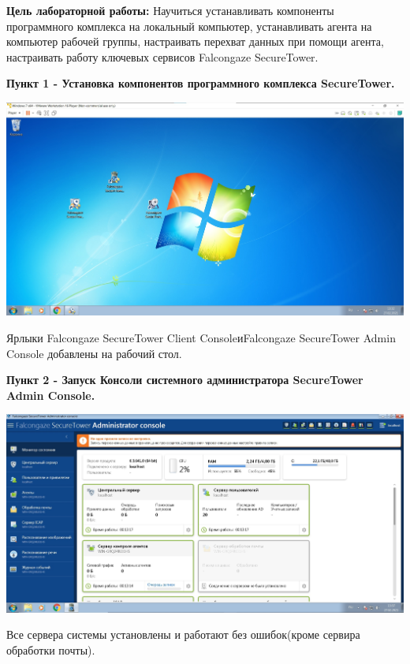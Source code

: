 \documentclass[a4paper,14pt]{extarticle}
\begin{document}
    \textbf{Цель лабораторной работы:}
    Научиться устанавливать компоненты программного комплекса на локальный компьютер, 
    устанавливать агента на компьютер рабочей группы, настраивать перехват данных при 
    помощи агента, настраивать работу ключевых сервисов Falcongaze SecureTower.

    \textbf{Пункт 1 - Установка компонентов программного комплекса SecureTower.} 
    \begin{center}
        \includegraphics[scale=0.25]{pics/1.jpg}

        Ярлыки Falcongaze SecureTower Client ConsoleиFalcongaze SecureTower Admin Console добавлены на рабочий стол.
    \end{center}

    \textbf{Пункт 2 - Запуск Консоли системного администратора SecureTower Admin Console.} 
    \begin{center}
        \includegraphics[scale=0.25]{pics/2.jpg}

        Все сервера системы установлены и работают без ошибок(кроме сервира обработки почты).
    \end{center}
\end{document}
